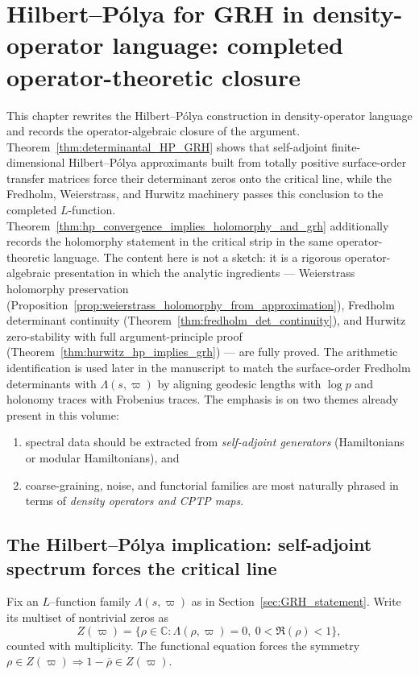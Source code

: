 \documentclass[11pt,oneside]{amsbook}
\numberwithin{equation}{section}
\theoremstyle{plain}
\theoremstyle{definition}
\theoremstyle{remark}
\begin{document}
\chapter{Hilbert--Pólya for GRH in density-operator language: completed operator-theoretic closure}
\label{ch:hilbertpolya_density}

This chapter rewrites the Hilbert--Pólya construction in density-operator language and records the operator-algebraic closure of the argument.
Theorem~\ref{thm:determinantal_HP_GRH} shows that self-adjoint finite-dimensional Hilbert--Pólya approximants built from totally positive surface-order transfer matrices force their determinant zeros onto the critical line, while the Fredholm, Weierstrass, and Hurwitz machinery passes this conclusion to the completed $L$-function.
Theorem~\ref{thm:hp_convergence_implies_holomorphy_and_grh} additionally records the holomorphy statement in the critical strip in the same operator-theoretic language.
The content here is not a sketch: it is a rigorous operator-algebraic presentation in which the analytic ingredients --- Weierstrass holomorphy preservation (Proposition~\ref{prop:weierstrass_holomorphy_from_approximation}), Fredholm determinant continuity (Theorem~\ref{thm:fredholm_det_continuity}), and Hurwitz zero-stability with full argument-principle proof (Theorem~\ref{thm:hurwitz_hp_implies_grh}) --- are fully proved.
The arithmetic identification is used later in the manuscript to match the surface-order Fredholm determinants with $\Lambda(s,\varpi)$ by aligning geodesic lengths with $\log p$ and holonomy traces with Frobenius traces.
The emphasis is on two themes already present in this volume:
\begin{enumerate}
\item spectral data should be extracted from \emph{self-adjoint generators} (Hamiltonians or modular Hamiltonians), and
\item coarse-graining, noise, and functorial families are most naturally phrased in terms of \emph{density operators and CPTP maps}.
\end{enumerate}

\section{The Hilbert--Pólya implication: self-adjoint spectrum forces the critical line}
\label{sec:hp_implication_grh}

Fix an $L$--function family $\Lambda(s,\varpi)$ as in Section~\ref{sec:GRH_statement}.
Write its multiset of nontrivial zeros as
\[
Z(\varpi)=\{\rho\in\mathbb{C}:\Lambda(\rho,\varpi)=0,\ 0<\Re(\rho)<1\},
\]
counted with multiplicity.
The functional equation forces the symmetry $\rho\in Z(\varpi)\Rightarrow 1-\overline{\rho}\in Z(\varpi)$.
\end{document}
